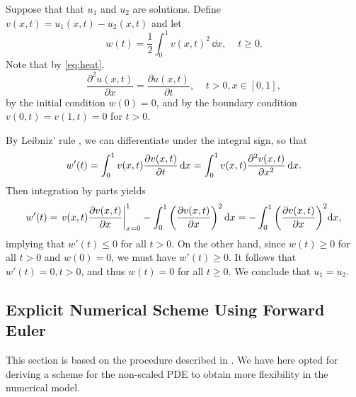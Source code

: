 Suppose that that $u_1$ and $u_2$ are solutions. Define $v(x,t)=u_1(x,t)-u_2(x,t)$ and let
\begin{equation*}
    w(t)=\frac{1}{2}\int_0^1v(x,t)^2\,\dd x,\;\;\;\; t\ge0.
\end{equation*}
Note that by \cref{eq:heat},
\begin{equation*}
    \frac{\partial^2 u(x,t)}{\partial x}= \frac{\partial u(x,t)}{\partial t},\;\;\;\;t>0,x\in[0,1],
\end{equation*}
by the initial condition $w(0)=0$, and by the boundary condition $v(0,t)=v(1,t)=0$ for $t>0$.

By Leibniz' rule \cite[8.11.2]{die69}, we can differentiate under the integral sign, so that
\begin{equation*}
    w'(t) = \int_0^1v(x,t)\pdv{v(x,t)}{t}\,\dd x = \int_0^1 v(x,t)\pdv[2]{v(x,t)}{x}\,\dd x.
\end{equation*}
Then integration by parts yields
\begin{equation*}
    w'(t) = \eval{v(x,t)\pdv{v(x,t)}{x}}_{x=0}^1 - \int_0^1\qty(\pdv{v(x,t)}{x})^2\,\dd x = -\int_0^1\qty(\pdv{v(x,t)}{x})^2\dd x,
\end{equation*}
implying that $w'(t)\le 0$ for all $t>0$. On the other hand, since $w(t)\ge0$ for all $t>0$ and $w(0)=0$, we must have $w'(t)\ge0$. It follows that $w'(t)=0, t>0$, and thus $w(t)=0$ for all $t\ge0$. We conclude that $u_1=u_2$.


\subsection{Explicit Numerical Scheme Using Forward Euler}\label{sec:Heat numerical Theory}
This section is based on the procedure described in \cite{hpl}. We have here opted for deriving a scheme for the non-scaled PDE to obtain more flexibility in the numerical model.

